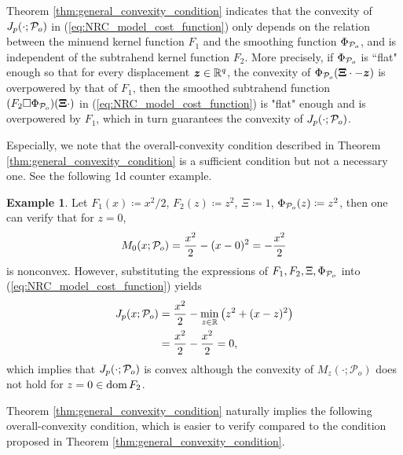 \documentclass[lettersize,journal]{IEEEtran}
\theoremstyle{plain}%
\theoremstyle{definition}
\newtheorem{example}{Example}
\theoremstyle{remark}
\begin{document}
Theorem \ref{thm:general_convexity_condition} indicates that the convexity of $J_{p}(\cdot;\mathcal{P}_{o})$ in (\ref{eq:NRC_model_cost_function}) only depends on the relation between the minuend kernel function $F_1$ and the smoothing function $\Phi_{\mathcal{P}_o}$, and is independent of the subtrahend kernel function $F_2$. More precisely, if $\Phi_{\mathcal{P}_o}$ is ``flat" enough so that for every displacement $\bm{z}\in\mathbb{R}^q$, the convexity of $\Phi_{\mathcal{P}_o}(\bm{\Xi}\cdot-\bm{z})$ is overpowered by that of $F_1$, then the smoothed subtrahend function $(F_2\Box\Phi_{\mathcal{P}_o})(\bm{\Xi}\cdot)$ in (\ref{eq:NRC_model_cost_function}) is "flat" enough and is overpowered by $F_1$, which in turn guarantees the convexity of $J_{p}(\cdot;\mathcal{P}_o)$.

Especially, we note that the overall-convexity condition described in Theorem \ref{thm:general_convexity_condition} is a sufficient condition but not a necessary one. See the following 1d counter example.
\begin{example}
Let $F_1(x)\coloneqq x^2/2$, $F_2(z)\coloneqq z^2$, $\Xi\coloneqq 1$, $\Phi_{\mathcal{P}_o}(z)\coloneqq z^2$, then one can verify that for $z=0$, 
\begin{equation*}
M_0(x;\mathcal{P}_o)=\frac{x^2}{2}-(x-0)^2=-\frac{x^2}{2}
\end{equation*}
is nonconvex. However, substituting the expressions of $F_1,F_2,\Xi,\Phi_{\mathcal{P}_o}$ into (\ref{eq:NRC_model_cost_function}) yields
\begin{align*}
J_{p}(x;\mathcal{P}_o) &=\frac{x^2}{2}-\min_{z\in\mathbb{R}}\left( z^2+(x-z)^2 \right )\\
&=\frac{x^2}{2}-\frac{x^2}{2}=0,
\end{align*}
which implies that $J_{p}(\cdot;\mathcal{P}_o)$ is convex although the convexity of $M_{z}(\cdot;\mathcal{P}_o)$ does not hold for $z=0\in\textrm{dom\,} F_2$.
\end{example}

Theorem \ref{thm:general_convexity_condition} naturally implies the following overall-convexity condition, which is easier to verify compared to the condition proposed in Theorem \ref{thm:general_convexity_condition}.
\end{document}
